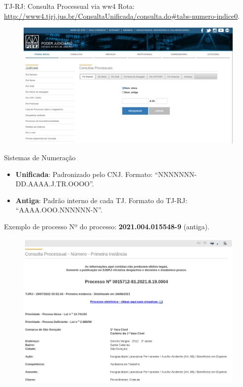 \begin{frame}{TJ-RJ: Consulta Processual via ww4}
    \tiny Rota: \url{http://www4.tjrj.jus.br/ConsultaUnificada/consulta.do\#tabs-numero-indice0}.
    \begin{figure}[htb]
        \includegraphics[keepaspectratio,width=1\textheight]{img/tj-rj-pagina-consulta}
    \end{figure}
\end{frame}

\begin{frame}{Sistemas de Numeração}
    \begin{itemize}
        \item \textbf{Unificada}: Padronizado pelo CNJ. Formato:
            ``NNNNNNN-DD.AAAA.J.TR.OOOO''.
        \item \textbf{Antiga}: Padrão interno de cada TJ. Formato do TJ-RJ:
            ``AAAA.OOO.NNNNNN-N''.
    \end{itemize}
\end{frame}

\begin{frame}{Exemplo de processo}
    Nº do processo: \textbf{2021.004.015548-9} (antiga).

    \begin{figure}[htb]
        \includegraphics[keepaspectratio,width=0.8\textheight]{img/tj-rj-exemplo-de-processo}
    \end{figure}
\end{frame}

